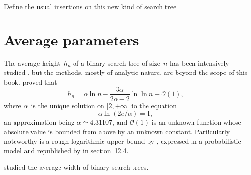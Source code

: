 Define the usual insertions on this new kind of search tree.



\section{Average parameters}

The average height~\(h_n\) of a binary search tree of size~\(n\) has
been intensively studied \citep{Devroye_1986, Devroye_1987,
  Mahmoud_1992, KnesslSpankowski_2002}, but the methods, mostly of
analytic nature, are beyond the scope of this book. \cite{Reed_2003}
proved that
\begin{equation*}
h_n = \alpha \ln n - \frac{3\alpha}{2\alpha - 2} \ln\ln n + \mathcal{O}(1),
\end{equation*}
where \(\alpha\)~is the unique solution on \([2,+\infty[\) to the
equation
\begin{equation*}
  \alpha\ln(2e/\alpha) = 1,
\end{equation*}
an approximation being \(\alpha \simeq 4.31107\), and
\(\mathcal{O}(1)\) is an unknown function whose absolute value is
bounded from above by an unknown constant. Particularly noteworthy is
a rough logarithmic upper bound by \cite{Aslam_2001}, expressed in a
probabilistic model and republished by \cite{CLRS_2009} in
section~12.4.

\cite{ChauvinDrmotaJabbour-Hattab_2001} studied the average width of
binary search trees.
